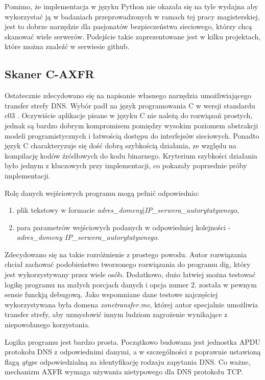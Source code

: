 Pomimo, że implementacja w języku Python nie okazała się na tyle wydajna aby wykorzystać ją w badaniach przeprowadzonych w ramach tej pracy magisterskiej, jest to dobrze narzędzie dla pasjonatów bezpieczeństwa sieciowego, którzy chcą skanować wiele serwerów. Podejście takie zaprezentowane jest w kilku projektach, które można znaleźć w serwiesie github\cite{github-axfr}.

\subsection{Skaner C-AXFR}
Ostatecznie zdecydowano się na napisanie własnego narzędzia umożliwiającego transfer strefy DNS. Wybór padł na język programowania C \cite{clanguage} w wersji standardu c03 \cite{c03std}. Oczywiście aplikacje pisane w języku C nie należą do rozwiązań prostych, jednak są bardzo dobrym kompromisem pomiędzy wysokim poziomem abstrakcji modeli programistycznych i łatwością dostępu do interfejsów sieciowych. Ponadto język C charakteryzuje się dość dobrą szybkością działania, ze względu na kompilację kodów źródłowych do kodu binarnego. Kryterium szybkości działania było jednym z kluczowych przy implementacji, co pokazały poprzednie próby implementacji.

Rolę danych wejściowych programu mogą pełnić odpowiednio:
\begin{enumerate}
	\item plik tekstowy w formacie \textit{adres\_domeny}|\textit{IP\_serwera\_autorytatywnego},
	\item para parametrów wejściowych podanych w odpowiedniej kolejności - \textit{adres\_domeny IP\_serwera\_autorytatywnego}. 
\end{enumerate}
Zdecydowano się na takie rozróżnienie z prostego powodu. Autor rozwiązania chciał zachować podobieństwo tworzonego rozwiązania do programu dig, który jest wykorzystywany przez wiele osób. Dodatkowo, dużo łatwiej można testować logikę programu na małych porcjach danych i opcja numer 2. została w pewnym sensie funckją debugową. Jako wspomniane dane testowe najczęściej wykorzystywana była domena \textit{zonetransfer.me}\cite{zonetransfer}, której autor specjalnie umożliwia transfer strefy, aby uzmysłowić innym ludziom zagrożenie wynikające z niepowołanego korzystania.

Logika programu jest bardzo prosta. Początkowo budowana jest jednostka APDU protokołu DNS z odpowiednimi danymi, a w szczególności z poprawnie ustawioną flagą \textit{qtype} odpowiedzialną za identyfikację rodzaju zapytania DNS. Co ważne, mechanizm AXFR wymaga używania nietypowego dla DNS protokołu TCP.

